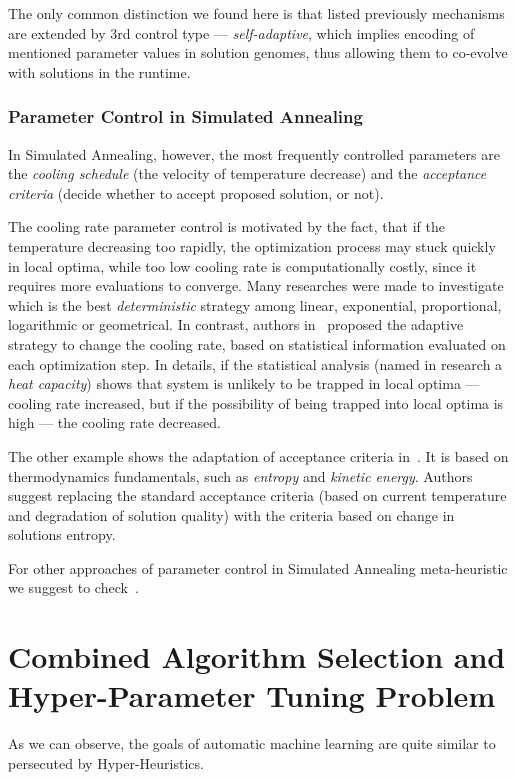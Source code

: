 The only common distinction we found here is that listed previously mechanisms are extended by 3rd control type — \textit{self-adaptive}, which implies encoding of mentioned parameter values in solution genomes, thus allowing them to co-evolve with solutions in the runtime.

\subsubsection{Parameter Control in Simulated Annealing}\label{bg: parameter control: SA}
In Simulated Annealing, however, the most frequently controlled parameters are the \textit{cooling schedule} (the velocity of temperature decrease) and the \textit{acceptance criteria} (decide whether to accept proposed solution, or not).

The cooling rate parameter control is motivated by the fact, that if the temperature decreasing too rapidly, the optimization process may stuck quickly in local optima, while too low cooling rate is computationally costly, since it requires more evaluations to converge. Many researches were made to investigate which is the best \textit{deterministic} strategy among linear, exponential, proportional, logarithmic or geometrical. In contrast, authors in~\cite{karabin2020simulated} proposed the adaptive strategy to change the cooling rate, based on statistical information evaluated on each optimization step. In details, if the statistical analysis (named in research a \textit{heat capacity}) shows that system is unlikely to be trapped in local optima — cooling rate increased, but if the possibility of being trapped into local optima is high — the cooling rate decreased.

The other example shows the adaptation of acceptance criteria in~\cite{ghandeshtani2019entropy}. It is based on thermodynamics fundamentals, such as \textit{entropy} and \textit{kinetic energy}. Authors suggest replacing the standard acceptance criteria (based on current temperature and degradation of solution quality) with the criteria based on change in solutions entropy.

For other approaches of parameter control in Simulated Annealing meta-heuristic we suggest to check~\cite{ingber2000adaptive,de2003placement}.


\section{Combined Algorithm Selection and Hyper-Parameter Tuning Problem}\label{bg: section cash}
As we can observe, the goals of automatic machine learning are quite similar to persecuted by Hyper-Heuristics.

